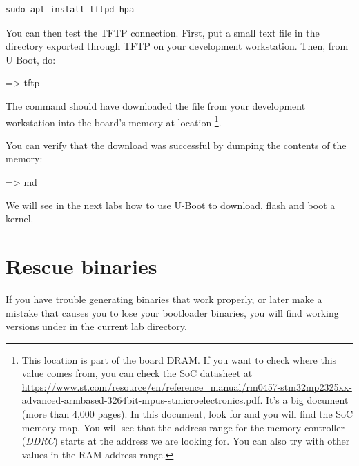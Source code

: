 \begin{verbatim}
sudo apt install tftpd-hpa
\end{verbatim}

You can then test the TFTP connection. First, put a small text file in
the directory exported through TFTP on your development
workstation. Then, from U-Boot, do:

\begin{ubootinput}
=> tftp %
\end{ubootinput}

The  command should have downloaded the
 file from your development workstation into
the board's memory at location {\tt \zimageboardaddr}\footnote{
This location is part of the board DRAM. If you want
to check where this value comes from, you can check the SoC
datasheet at
\url{https://www.st.com/resource/en/reference_manual/rm0457-stm32mp2325xx-advanced-armbased-3264bit-mpus-stmicroelectronics.pdf}.
It's a big document (more than 4,000 pages). In this document, look
for  and you will find the SoC memory map.
You will see that the address range for the memory controller
({\em DDRC})
starts at the address we are looking for.
You can also try with other values in the RAM address range.}.

You can verify that the download was successful by dumping the
contents of the memory:

\begin{ubootinput}
=> md %
\end{ubootinput}

We will see in the next labs how to use U-Boot to download, flash and
boot a kernel.

\section{Rescue binaries}

If you have trouble generating binaries that work properly, or later
make a mistake that causes you to lose your bootloader binaries, you
will find working versions under  in the current lab
directory.

